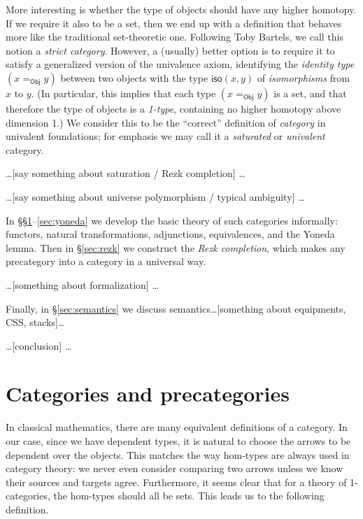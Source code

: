 \documentclass{amsart}
\theoremstyle{definition}
\theoremstyle{remark}
\numberwithin{equation}{section}
\begin{document}
More interesting is whether the type of objects should have any higher homotopy.
If we require it also to be a set, then we end up with a definition that behaves more like the traditional set-theoretic one.
Following Toby Bartels, we call this notion a \emph{strict category}.
However, a (usually) better option is to require it to satisfy a generalized version of the univalence axiom, identifying the \emph{identity type} $(x=_{\mathsf{Obj}} y)$ between two objects with the type $\mathsf{iso}(x,y)$ of \emph{isomorphisms} from $x$ to $y$.
(In particular, this implies that each type $(x=_{\mathsf{Obj}} y)$ is a set, and that therefore the type of objects is a \emph{1-type}, containing no higher homotopy above dimension 1.)
We consider this to be the ``correct'' definition of \emph{category} in univalent foundations; for emphasis we may call it a \emph{saturated} or \emph{univalent} category.

\dots [say something about saturation / Rezk completion] \dots

\dots [say something about universe polymorphism / typical ambiguity] \dots

In \S\S\ref{sec:cats}--\ref{sec:yoneda} we develop the basic theory of such categories informally: functors, natural transformations, adjunctions, equivalences, and the Yoneda lemma.
Then in \S\ref{sec:rezk} we construct the \emph{Rezk completion}, which makes any precategory into a category in a universal way.

\dots [something about formalization] \dots

Finally, in \S\ref{sec:semantics} we discuss semantics\dots [something about equipments, CSS, stacks]\dots

\dots [conclusion] \dots
{}


\section{Categories and precategories}
\label{sec:cats}

In classical mathematics, there are many equivalent definitions of a category.
In our case, since we have dependent types, it is natural to choose the arrows to be dependent over the objects.
This matches the way hom-types are always used in category theory: we never even consider comparing two arrows unless we know their sources and targets agree.
Furthermore, it seems clear that for a theory of 1-categories, the hom-types should all be sets.
This leads us to the following definition.
\end{document}
